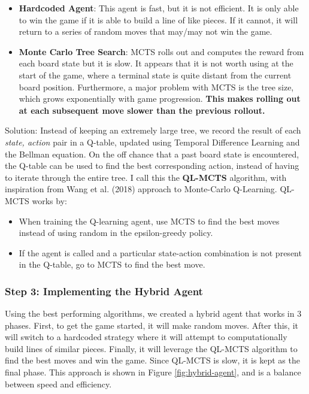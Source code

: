 \begin{itemize}
    \item \textbf{Hardcoded Agent}: This agent is fast, but it is not efficient. It is only able to win the game if it is able to build a line of like pieces. If it cannot, it will return to a series of random moves that may/may not win the game.
    \item \textbf{Monte Carlo Tree Search}: MCTS rolls out and computes the reward from each board state but it is slow. It appears that it is not worth using at the start of the game, where a terminal state is quite distant from the current board position. Furthermore, a major problem with MCTS is the tree size, which grows exponentially with game progression. \textbf{This makes rolling out at each subsequent move slower than the previous rollout.} \\
\end{itemize}

Solution: Instead of keeping an extremely large tree, we record the result of each \textit{state, action} pair in a Q-table, updated using Temporal Difference Learning and the Bellman equation. On the off chance that a past board state is encountered, the Q-table can be used to find the best corresponding action, instead of having to iterate through the entire tree. I call this the \textbf{QL-MCTS} algorithm, with inspiration from Wang et al. (2018) approach to Monte-Carlo Q-Learning. QL-MCTS works by:

\begin{itemize}
    \item When training the Q-learning agent, use MCTS to find the best moves instead of using random in the epsilon-greedy policy.
    \item If the agent is called and a particular state-action combination is not present in the Q-table, go to MCTS to find the best move.
\end{itemize}

\subsubsection{Step 3: Implementing the Hybrid Agent}

Using the best performing algorithms, we created a hybrid agent that works in 3 phases. First, to get the game started, it will make random moves. After this, it will switch to a hardcoded strategy where it will attempt to computationally build lines of similar pieces. Finally, it will leverage the QL-MCTS algorithm to find the best moves and win the game. Since QL-MCTS is slow, it is kept as the final phase. This approach is shown in Figure \ref{fig:hybrid-agent}, and is a balance between speed and efficiency.

